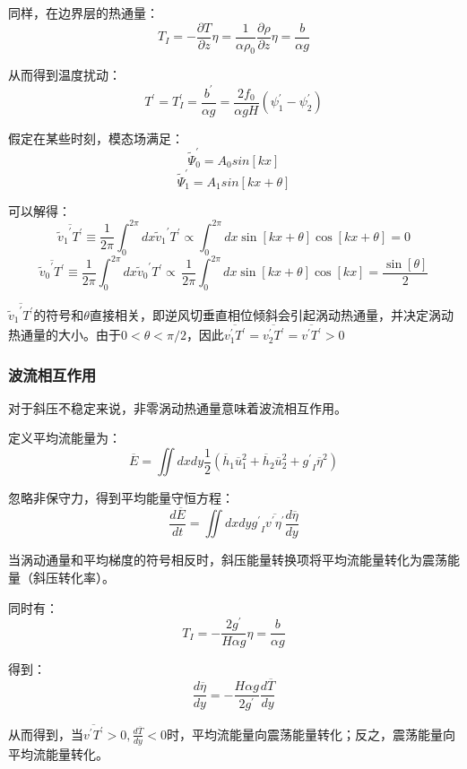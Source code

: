 \documentclass{article}
\begin{document}
同样，在边界层的热通量：
$$T_I = -\frac{\partial T}{\partial z}\eta = \frac{1}{\alpha\rho_0}\frac{\partial \rho}{\partial z}\eta = \frac{b}{\alpha g }$$

从而得到温度扰动：
$$T^{\prime} = T_I^{\prime} = \frac{b^{\prime}}{\alpha g} = \frac{2f_0}{\alpha gH}(\psi_1^{\prime}-\psi_2^{\prime})$$

假定在某些时刻，模态场满足：
$$\tilde{\Psi}_0^{\prime} = A_0sin[kx]$$
$$\tilde{\Psi}_1^{\prime} = A_1sin[kx+\theta]$$

可以解得：
$$\overline{{{\widetilde{v}}_{1}}^{\prime }{T}^{\prime}}\equiv \frac{1}{2\pi }\int_{0}^{2\pi }{dx}{{\widetilde{v}}_{1}}^{\prime }{T}^{\prime}\propto \int_{0}^{2\pi }{dx}\sin [kx+\theta ]\cos [kx+\theta ]=0$$
$$\overline{{{\widetilde{v}}_{0}}^{\prime }{T}^{\prime}}\equiv \frac{1}{2\pi }\int_{0}^{2\pi }{dx}{{\widetilde{v}}_{0}}^{\prime }{T}^{\prime}\overset{}{\mathop{\propto }}\,\frac{1}{2\pi }\int_{0}^{2\pi }{dx}\sin [kx+\theta ]\cos [kx]=\frac{\sin [\theta ]}{2}$$

$\overline{{{\widetilde{v}}_{1}}^{\prime }{T}^{\prime}}$的符号和$\theta$直接相关，即逆风切垂直相位倾斜会引起涡动热通量，并决定涡动热通量的大小。由于$0<\theta<\pi/2$，因此$\overline{v_1^{\prime}T^{\prime}}=\overline{v_2^{\prime}T^{\prime}}=\overline{v^{\prime}T^{\prime}}>0$

\subsubsection{波流相互作用}
对于斜压不稳定来说，非零涡动热通量意味着波流相互作用。

定义平均流能量为：
$$\overline{E}=\iint{dxdy\frac{1}{2}}({{\overline{h}}_{1}}\overline{u}_{1}^{2}+{{\overline{h}}_{2}}\overline{u}_{2}^{2}+{{{g}^{\prime}}_{I}}{{\overline{\eta }}^{2}})$$

忽略非保守力，得到平均能量守恒方程：
$$\frac{d\overline{E}}{dt}=\iint{dxdy}{{{g}^{\prime}}_{I}}\overline{{v}^{\prime}{\eta }^{\prime}}\frac{d\overline{\eta }}{dy}$$

当涡动通量和平均梯度的符号相反时，斜压能量转换项将平均流能量转化为震荡能量（斜压转化率）。

同时有：
$$T_I = -\frac{2g^{\prime}}{H\alpha g}\eta = \frac{b}{\alpha g }$$

得到：
$$\frac{d\overline{\eta }}{dy} = -\frac{H\alpha g}{2g^{\prime}}\frac{d\overline{T}}{dy}$$

从而得到，当$\overline{v^{\prime}T^{\prime}}>0, \frac{d\overline{T}}{dy}<0$时，平均流能量向震荡能量转化；反之，震荡能量向平均流能量转化。
\end{document}
